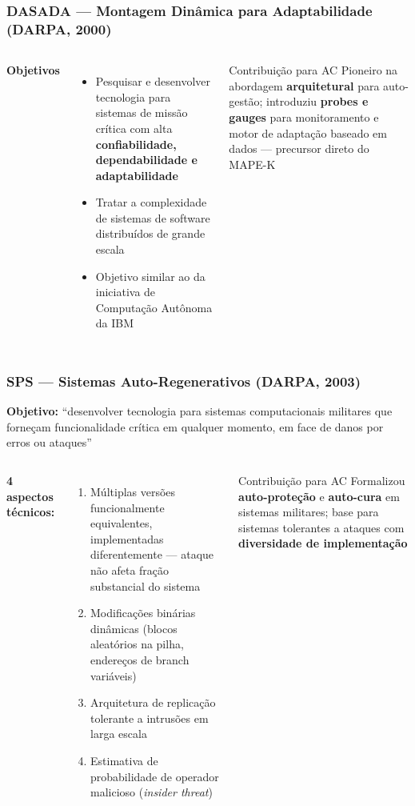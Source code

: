 \documentclass{beamer}
\begin{document}
  \begin{frame}
    \frametitle{DASADA --- Montagem Dinâmica para Adaptabilidade (DARPA, 2000)}
    \begin{columns}
      \textbf{Objetivos}
      \begin{itemize}
        \footnotesize
        \item Pesquisar e desenvolver tecnologia para sistemas de missão crítica com alta \textbf{confiabilidade, dependabilidade e adaptabilidade}
        \item Tratar a complexidade de sistemas de software distribuídos de grande escala
        \item Objetivo similar ao da iniciativa de Computação Autônoma da IBM
      \end{itemize}
      \begin{block}{\footnotesize Contribuição para AC}
        \footnotesize
        Pioneiro na abordagem \textbf{arquitetural} para auto-gestão; introduziu \textbf{probes e gauges} para monitoramento e motor de adaptação baseado em dados --- \alert{precursor direto do MAPE-K}
      \end{block}
    \end{columns}
    \vspace{0.15cm}
  \end{frame}

  \begin{frame}
    \frametitle{SPS --- Sistemas Auto-Regenerativos (DARPA, 2003)}
    \footnotesize
    \textbf{Objetivo:} ``desenvolver tecnologia para sistemas computacionais militares que forneçam funcionalidade crítica em qualquer momento, em face de danos por erros ou ataques'' 
    \vspace{0.15cm}
    \begin{columns}
      \textbf{4 aspectos técnicos:}
      \begin{enumerate}
        \footnotesize
        \item Múltiplas versões funcionalmente equivalentes, implementadas diferentemente --- ataque não afeta fração substancial do sistema
        \item Modificações binárias dinâmicas (blocos aleatórios na pilha, endereços de branch variáveis)
        \item Arquitetura de replicação tolerante a intrusões em larga escala
        \item Estimativa de probabilidade de operador malicioso (\textit{insider threat})
      \end{enumerate}
      \begin{alertblock}{\footnotesize Contribuição para AC}
        \footnotesize
        Formalizou \textbf{auto-proteção} e \textbf{auto-cura} em sistemas militares; base para sistemas tolerantes a ataques com \textbf{diversidade de implementação}
      \end{alertblock}
    \end{columns}
    \vspace{0.1cm}
  \end{frame}
\end{document}
